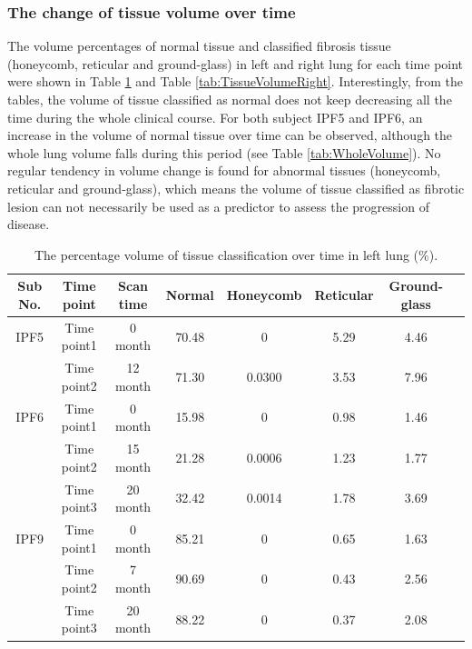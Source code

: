 \subsubsection{The change of tissue volume over time}
The volume percentages of normal tissue and classified fibrosis tissue (honeycomb, reticular and ground-glass) in left and right lung for each time point were shown in Table \ref{tab:TissueVolumeLeft} and Table \ref{tab:TissueVolumeRight}. Interestingly, from the tables, the volume of tissue classified as normal does not keep decreasing all the time during the whole clinical course. For both subject IPF5 and IPF6, an increase in the volume of normal tissue over time can be observed, although the whole lung volume falls during this period (see Table \ref{tab:WholeVolume}). No regular tendency in volume change is found for abnormal tissues (honeycomb, reticular and ground-glass), which means the volume of tissue classified as fibrotic lesion can not necessarily be used as a predictor to assess the progression of disease.

\begin{table}[htbp]
\centering
\caption{The percentage volume of tissue classification over time in left lung (\%).}
\label{tab:TissueVolumeLeft}
\begin{tabular}{c c c c c c c c}
\hline
\bf{Sub No.} & \bf{Time point} & \bf{Scan time}	& \bf{Normal} &	\bf{Honeycomb} & \bf{Reticular} & \bf{Ground-glass}\\ 
\hline
IPF5 & Time point1 &  0 month & 70.48 & 0 & 5.29 & 4.46\\
\quad & Time point2 & 12 month & 71.30 & 0.0300 & 3.53 & 7.96\\
\hline
IPF6 & Time point1 &	0 month &	15.98 &	0 & 0.98 & 1.46\\
\quad & Time point2 &	15 month &	21.28 &	0.0006 & 1.23 & 1.77\\
\quad & Time point3 &	20 month &	32.42 &	0.0014 & 1.78 & 3.69\\
\hline
IPF9 & Time point1 &	0 month &	85.21 &	0 & 0.65 & 1.63\\
\quad & Time point2 &	7 month &	90.69 &	0 & 0.43 & 2.56\\
\quad & Time point3 &	20 month &	88.22 &	0 & 0.37 & 2.08\\
\hline
\end{tabular}
\end{table}

